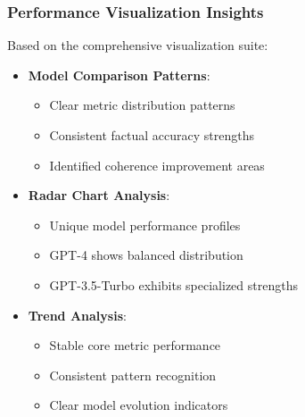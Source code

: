 \subsubsection{Performance Visualization Insights}
Based on the comprehensive visualization suite:
\begin{itemize}
    \item \textbf{Model Comparison Patterns}:
    \begin{itemize}
        \item Clear metric distribution patterns
        \item Consistent factual accuracy strengths
        \item Identified coherence improvement areas
    \end{itemize}
    \item \textbf{Radar Chart Analysis}:
    \begin{itemize}
        \item Unique model performance profiles
        \item GPT-4 shows balanced distribution
        \item GPT-3.5-Turbo exhibits specialized strengths
    \end{itemize}
    \item \textbf{Trend Analysis}:
    \begin{itemize}
        \item Stable core metric performance
        \item Consistent pattern recognition
        \item Clear model evolution indicators
    \end{itemize}
\end{itemize}

